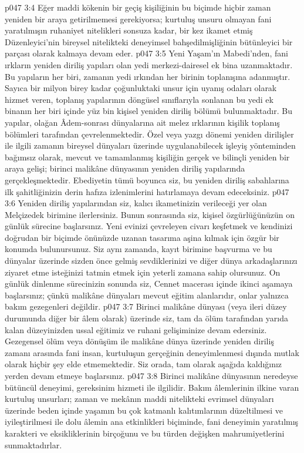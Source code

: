 \vs p047 3:4 Eğer maddi kökenin bir geçiş kişiliğinin bu biçimde hiçbir zaman yeniden bir araya getirilmemesi gerekiyorsa; kurtuluş unsuru olmayan fani yaratılmışın ruhaniyet nitelikleri sonsuza kadar, bir kez ikamet etmiş Düzenleyici’nin bireysel nitelikteki deneyimsel bahşedilmişliğinin bütünleyici bir parçası olarak kalmaya devam eder.
\vs p047 3:5 Yeni Yaşam’ın Mabedi’nden, fani ırkların yeniden diriliş yapıları olan yedi merkezi\hyp{}dairesel ek bina uzanmaktadır. Bu yapıların her biri, zamanın yedi ırkından her birinin toplanışına adanmıştır. Sayıca bir milyon birey kadar çoğunluktaki unsur için uyanış odaları olarak hizmet veren, toplanış yapılarının döngüsel sınıflarıyla sonlanan bu yedi ek binanın her biri içinde yüz bin kişisel yeniden diriliş bölümü bulunmaktadır. Bu yapılar, olağan Âdem\hyp{}sonrası dünyalarına ait melez ırklarının kişilik toplanış bölümleri tarafından çevrelenmektedir. Özel veya yazgı dönemi yeniden dirilişler ile ilgili zamanın bireysel dünyaları üzerinde uygulanabilecek işleyiş yönteminden bağımsız olarak, mevcut ve tamamlanmış kişiliğin gerçek ve bilinçli yeniden bir araya gelişi; birinci malikâne dünyasının yeniden diriliş yapılarında gerçekleşmektedir. Ebediyetin tümü boyunca siz, bu yeniden diriliş sabahlarına ilk şahitliğinizin derin hafıza izlenimlerini hatırlamaya devam edeceksiniz.
\vs p047 3:6 Yeniden diriliş yapılarından siz, kalıcı ikametinizin verileceği yer olan Melçizedek birimine ilerlersiniz. Bunun sonrasında siz, kişisel özgürlüğünüzün on günlük sürecine başlarsınız. Yeni evinizi çevreleyen civarı keşfetmek ve kendinizi doğrudan bir biçimde önünüzde uzanan tasarıma aşina kılmak için özgür bir konumda bulunursunuz. Siz aynı zamanda, kayıt birimine başvurma ve bu dünyalar üzerinde sizden önce gelmiş sevdiklerinizi ve diğer dünya arkadaşlarınızı ziyaret etme isteğinizi tatmin etmek için yeterli zamana sahip olursunuz. On günlük dinlenme sürecinizin sonunda siz, Cennet macerası içinde ikinci aşamaya başlarsınız; çünkü malikâne dünyaları mevcut eğitim alanlarıdır, onlar yalnızca bakım gezegenleri değildir.
\vs p047 3:7 Birinci malikâne dünyası (veya ileri düzey durumunda diğer bir âlem olarak) üzerinde siz, tam da ölüm tarafından yarıda kalan düzeyinizden ussal eğitimiz ve ruhani gelişiminize devam edersiniz. Gezegensel ölüm veya dönüşüm ile malikâne dünya üzerinde yeniden diriliş zamanı arasında fani insan, kurtuluşun gerçeğinin deneyimlenmesi dışında mutlak olarak hiçbir şey elde etmemektedir. Siz orada, tam olarak aşağıda kaldığınız yerden devam etmeye başlarsınız.
\vs p047 3:8 Birinci malikâne dünyasının neredeyse bütüncül deneyimi, gereksinim hizmeti ile ilgilidir. Bakım âlemlerinin ilkine varan kurtuluş unsurları; zaman ve mekânın maddi nitelikteki evrimsel dünyaları üzerinde beden içinde yaşamın bu çok katmanlı kalıtımlarının düzeltilmesi ve iyileştirilmesi ile dolu âlemin ana etkinlikleri biçiminde, fani deneyimin yaratılmış karakteri ve eksikliklerinin birçoğunu ve bu türden değişken mahrumiyetlerini sunmaktadırlar.
